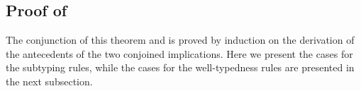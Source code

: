 



\subsection*{Proof of }

The conjunction of this theorem and  is proved by
induction on the derivation of the antecedents of the two conjoined
implications. Here we present the cases for the subtyping rules, while the
cases for the well-typedness rules are presented in the next subsection.

